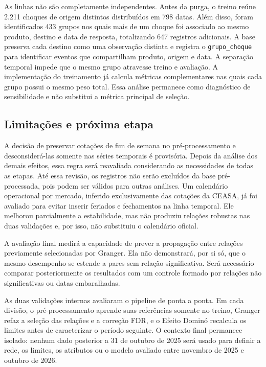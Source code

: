\documentclass[12pt,a4paper]{article}
\begin{document}
As linhas não são completamente independentes. Antes da purga, o treino reúne
2.211 choques de origem distintos distribuídos em 798 datas. Além disso, foram
identificados 433 grupos nos quais mais de um choque foi associado ao mesmo
produto, destino e data de resposta, totalizando 647 registros adicionais. A
base preserva cada destino como uma observação distinta e registra o
\texttt{grupo\_choque} para identificar eventos que compartilham produto,
origem e data. A separação temporal impede que o mesmo grupo atravesse treino e
avaliação. A implementação do treinamento já calcula métricas complementares
nas quais cada grupo possui o mesmo peso total. Essa análise permanece como
diagnóstico de sensibilidade e não substitui a métrica principal de seleção.

\subsection{Limitações e próxima etapa}

A decisão de preservar cotações de fim de semana no pré-processamento e
desconsiderá-las somente nas séries temporais é provisória. Depois da análise
dos demais efeitos, essa regra será reavaliada considerando as necessidades de
todas as etapas. Até essa revisão, os registros não serão excluídos da base
pré-processada, pois podem ser válidos para outras análises. Um calendário
operacional por mercado, inferido exclusivamente das cotações da CEASA, já foi
avaliado para evitar inserir feriados e fechamentos na linha temporal. Ele
melhorou parcialmente a estabilidade, mas não produziu relações robustas nas
duas validações e, por isso, não substituiu o calendário oficial.

A avaliação final medirá a capacidade de prever a propagação entre relações
previamente selecionadas por Granger. Ela não demonstrará, por si só, que o
mesmo desempenho se estende a pares sem relação significativa. Será necessário
comparar posteriormente os resultados com um controle formado por relações não
significativas ou datas embaralhadas.

As duas validações internas avaliaram o pipeline de ponta a ponta. Em
cada divisão, o pré-processamento aprende suas referências somente no treino,
Granger refaz a seleção das relações e a correção FDR, e o Efeito Dominó
recalcula os limites antes de caracterizar o período seguinte. O contexto final
permanece isolado: nenhum dado posterior a 31 de outubro de 2025 será usado para
definir a rede, os limites, os atributos ou o modelo avaliado entre novembro de
2025 e outubro de 2026.
\end{document}
